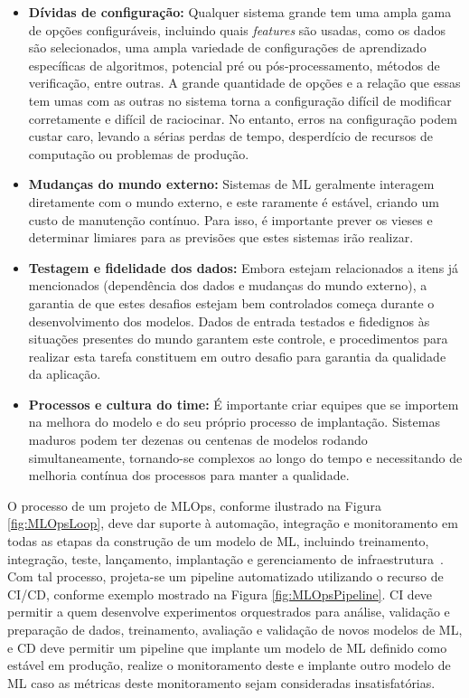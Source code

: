\documentclass[portugues]{ic-tese}
\begin{document}
\begin{itemize}
    \item \textbf{Dívidas de configuração:} Qualquer sistema grande tem uma ampla gama de opções configuráveis, incluindo quais \textit{features} são usadas, como os dados são selecionados, uma ampla variedade de configurações de aprendizado específicas de algoritmos, potencial pré ou pós-processamento, métodos de verificação, entre outras. A grande quantidade de opções e a relação que essas tem umas com as outras no sistema torna a configuração difícil de modificar corretamente e difícil de raciocinar. No entanto, erros na configuração podem custar caro, levando a sérias perdas de tempo, desperdício de recursos de computação ou problemas de produção.
    \item \textbf{Mudanças do mundo externo:} Sistemas de ML geralmente interagem diretamente com o mundo externo, e este raramente é estável, criando um custo de manutenção contínuo. Para isso, é importante prever os vieses e determinar limiares para as previsões que estes sistemas irão realizar.
    \item \textbf{Testagem e fidelidade dos dados:} Embora estejam relacionados a itens já mencionados (dependência dos dados e mudanças do mundo externo), a garantia de que estes desafios estejam bem controlados começa durante o desenvolvimento dos modelos. Dados de entrada testados e fidedignos às situações presentes do mundo garantem este controle, e procedimentos para realizar esta tarefa constituem em outro desafio para garantia da qualidade da aplicação.
    \item \textbf{Processos e cultura do time:} É importante criar equipes que se importem na melhora do modelo e do seu próprio processo de implantação. Sistemas maduros podem ter dezenas ou centenas de modelos rodando simultaneamente, tornando-se complexos ao longo do tempo e necessitando de melhoria contínua dos processos para manter a qualidade.
\end{itemize}

O processo de um projeto de MLOps, conforme ilustrado na Figura \ref{fig:MLOpsLoop}, deve dar suporte à automação, integração e monitoramento em todas as etapas da construção de um modelo de ML, incluindo treinamento, integração, teste, lançamento, implantação e gerenciamento de infraestrutura~\citep{Testi_2022}. Com tal processo, projeta-se um pipeline automatizado utilizando o recurso de CI/CD, conforme exemplo mostrado na Figura \ref{fig:MLOpsPipeline}. CI deve permitir a quem desenvolve experimentos orquestrados para análise, validação e preparação de dados, treinamento, avaliação e validação de novos modelos de ML, e CD deve permitir um pipeline que implante um modelo de ML definido como estável em produção, realize o monitoramento deste e implante outro modelo de ML caso as métricas deste monitoramento sejam consideradas insatisfatórias.
\end{document}
